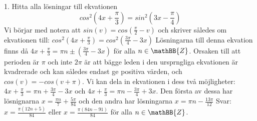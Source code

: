 \documentclass{article}
\begin{document}
  1. Hitta alla lösningar till ekvationen
  \begin{equation}
      cos^2(4x + \frac{\pi}{3}) = sin^2(3x-\frac{\pi}{4})
  \end{equation}
  Vi börjar med notera att $sin(v) = cos(\frac{\pi}{2} - v)$ och skriver således om ekvationen till: \newline\newline
  $cos^2(4x + \frac{\pi}{3}) = cos^2(\frac{3\pi}{4} - 3x)$\newline\newline
  Lösningarna till denna ekvation finns då $4x + \frac{\pi}{3} = \pi n \pm (\frac{3\pi}{4} - 3x)$ för alla $n \in \mathBB{Z}$. Orsaken till att perioden är $\pi$ och inte $2\pi$ är att bägge leden i den ursprngliga ekvationen är kvadrerade och kan således endast ge positiva värden, och $cos(v) = - cos(v + \pi)$. Vi kan dela in ekvationen i dess två möjligheter:\newline\newline
  $4x + \frac{\pi}{3} = \pi n + \frac{3\pi}{4} - 3x$ och $4x + \frac{\pi}{3} = \pi n - \frac{3\pi}{4} + 3x$.\newline\newline
  Den första av dessa har lösnignarna $x = \frac{\pi n}{7} + \frac{5\pi}{84}$ och den andra har lösningarna $x = \pi n - \frac{13\pi}{12}$\newline\newline
  Svar: $x = \frac{\pi(12n +5)}{84}$ eller $x = \frac{\pi(84n - 91)}{84}$ för alla $n \in \mathBB{Z}$.
  \newline \newline
  
\end{document}
